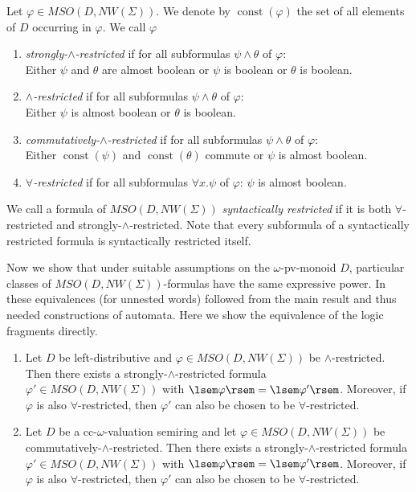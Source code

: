 \documentclass[runningheads, envcountsame, a4paper]{llncs}
\DeclareMathOperator{\const}{const}
\begin{document}
\begin{Def}Let $\varphi \in \mathit{MSO}(D, \mathit{NW}(\Sigma))$. We denote by $\const(\varphi)$ the set of all elements of $D$ occurring in $\varphi$. We call $\varphi$
	\begin{enumerate}
		\item \emph{strongly-$\wedge$-restricted} if for all subformulas $\psi \wedge \theta$ of $\varphi$: \\
		Either $\psi$ and $\theta$ are almost boolean or $\psi$ is boolean or $\theta$ is boolean.
		\item \emph{$\wedge$-restricted} if for all subformulas $\psi \wedge \theta$ of $\varphi$: \\
 		Either $\psi$ is almost boolean or $\theta$ is boolean.
		\item \emph{commutatively-$\wedge$-restricted} if for all subformulas $\psi \wedge \theta$ of $\varphi$: \\
 		Either $\const(\psi)$ and $\const(\theta)$ commute or $\psi$ is almost boolean. \item \emph{$\forall$-restricted} if for all subformulas $\forall x. \psi$ of $\varphi$: $\psi$ is almost boolean.
	\end{enumerate}
\end{Def}
We call a formula of $\mathit{MSO}(D, \mathit{NW}(\Sigma))$ \emph{syntactically restricted} if it is both $\forall$-restricted and strongly-$\wedge$-restricted. Note that every subformula of a syntactically restricted formula is syntactically restricted itself.
~\par
Now we show that under suitable assumptions on the $\omega$-pv-monoid $D$, particular classes of $\mathit{MSO}(D, \mathit{NW}(\Sigma))$-formulas have the same expressive power. In \cite{DM} these equivalences (for unnested words) followed from the main result and thus needed constructions of automata. Here we show the equivalence of the logic fragments directly.
\begin{Theorem}
	\label{thm:restrict}
	\begin{enumerate}[\quad(a)]
		\item Let $D$ be left-distributive and $\varphi \in \mathit{MSO}(D, \mathit{NW}(\Sigma))$ be $\wedge$-restricted. Then there exists a strongly-$\wedge$-restricted formula \\ $\varphi' \in \mathit{MSO}(D, \mathit{NW}(\Sigma))$ with $\lsem \varphi \rsem=\lsem \varphi' \rsem$. Moreover, if $\varphi$ is also $\forall$-restricted, then $\varphi'$ can also be chosen to be $\forall$-restricted.
		\item Let $D$ be a cc-$\omega$-valuation semiring and let $\varphi \in \mathit{MSO}(D, \mathit{NW}(\Sigma))$ be commutatively-$\wedge$-restricted. Then there exists a strongly-$\wedge$-restricted formula
$\varphi' \in \mathit{MSO}(D, \mathit{NW}(\Sigma))$ with $\lsem \varphi \rsem=\lsem \varphi' \rsem$. Moreover, if $\varphi$ is also $\forall$-restricted, then $\varphi'$ can also be chosen to be $\forall$-restricted.
	\end{enumerate}
\end{Theorem}
\end{document}
